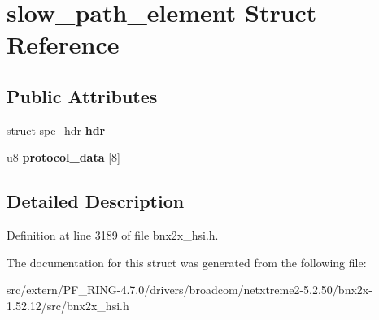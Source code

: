 \hypertarget{structslow__path__element}{
\section{slow\_\-path\_\-element Struct Reference}
\label{structslow__path__element}
}
\subsection*{Public Attributes}
\begin{DoxyCompactItemize}
\item 
\hypertarget{structslow__path__element_aba905fed380f41d5a3a1df6fc0c5170f}{
struct \hyperlink{structspe__hdr}{spe\_\-hdr} {\bfseries hdr}}
\label{structslow__path__element_aba905fed380f41d5a3a1df6fc0c5170f}

\item 
\hypertarget{structslow__path__element_a3c432f0fcb501aaf4422a7fe122d6e95}{
u8 {\bfseries protocol\_\-data} \mbox{[}8\mbox{]}}
\label{structslow__path__element_a3c432f0fcb501aaf4422a7fe122d6e95}

\end{DoxyCompactItemize}


\subsection{Detailed Description}


Definition at line 3189 of file bnx2x\_\-hsi.h.



The documentation for this struct was generated from the following file:\begin{DoxyCompactItemize}
\item 
src/extern/PF\_\-RING-\/4.7.0/drivers/broadcom/netxtreme2-\/5.2.50/bnx2x-\/1.52.12/src/bnx2x\_\-hsi.h\end{DoxyCompactItemize}
